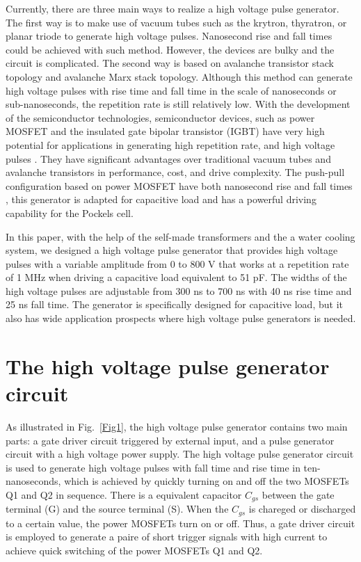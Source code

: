 \documentclass[aip,rsi,reprint,graphicx]{revtex4-1} %
\begin{document}
Currently, there are three main ways to realize a high voltage pulse generator.
The first way is to make use of vacuum tubes such as the krytron, thyratron, or planar triode to generate high voltage pulses\cite{Rohwein1995improved}.
Nanosecond rise and fall times could be achieved with such method. However, the devices are bulky and the circuit is complicated.
The second way is based on avalanche transistor stack topology and avalanche Marx stack topology\cite{Fulkerson1997,Bidin2009,bishop2006subnanosecond}.
Although this method can generate high voltage pulses with rise time and fall time in the scale of nanoseconds or sub-nanoseconds, the repetition rate is still relatively low.
With the development of the semiconductor technologies, semiconductor devices, such as power MOSFET and the insulated gate bipolar transistor (IGBT) have very high potential for applications in generating high repetition rate, and high voltage pulses \cite{wang2013semiconductor,Feng2011}.
They have significant advantages over traditional vacuum tubes and avalanche transistors in performance, cost, and drive complexity.
The push-pull configuration based on power MOSFET have both nanosecond rise and fall times \cite{bernius1990improved}, this generator is adapted for capacitive load and has a powerful driving capability for the Pockels cell.\par
In this paper, with the help of the self-made transformers and the a water cooling system, we designed a high voltage pulse generator that provides high voltage pulses with a variable amplitude from 0 to 800 V that works at a repetition rate of 1 MHz when driving a capacitive load equivalent to 51 pF.
 The widths of the high voltage pulses are adjustable from 300 ns to 700 ns with 40 ns rise time and 25 ns fall time.
 The generator is specifically designed for capacitive load, but it also has wide application prospects where high voltage pulse generators is needed.

\section{The high voltage pulse generator circuit}
As illustrated in Fig.~\ref{Fig1}, the high voltage pulse generator contains two main parts: a gate driver circuit triggered by external input, and a pulse generator circuit with a high voltage power supply. The high voltage pulse generator circuit is used to generate high voltage pulses with fall time and rise time in ten-nanoseconds, which is achieved by quickly turning on and off the two MOSFETs Q1 and Q2 in sequence. There is a equivalent capacitor $C_{gs}$ between the gate terminal (G) and the source terminal (S). When the $C_{gs}$ is chareged or discharged to a certain value, the power MOSFETs turn on or off. Thus, a gate driver circuit is employed to generate a paire of short trigger signals with high current to achieve quick switching of the power MOSFETs Q1 and Q2.
\end{document}
